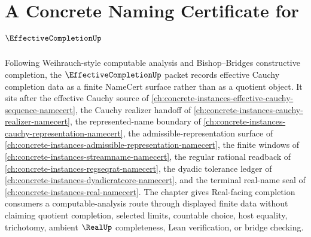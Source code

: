 \chapter{A Concrete Naming Certificate for $\EffectiveCompletionUp$}
\label{ch:concrete-instances-effective-completion-namecert}

Following Weihrauch-style computable analysis and Bishop--Bridges constructive completion, the $\EffectiveCompletionUp$ packet records effective Cauchy completion data as a finite NameCert surface rather than as a quotient object. It sits after the effective Cauchy source of \autoref{ch:concrete-instances-effective-cauchy-sequence-namecert}, the Cauchy realizer handoff of \autoref{ch:concrete-instances-cauchy-realizer-namecert}, the represented-name boundary of \autoref{ch:concrete-instances-cauchy-representation-namecert}, the admissible-representation surface of \autoref{ch:concrete-instances-admissible-representation-namecert}, the finite windows of \autoref{ch:concrete-instances-streamname-namecert}, the regular rational readback of \autoref{ch:concrete-instances-regseqrat-namecert}, the dyadic tolerance ledger of \autoref{ch:concrete-instances-dyadicratcore-namecert}, and the terminal real-name seal of \autoref{ch:concrete-instances-real-namecert}. The chapter gives Real-facing completion consumers a computable-analysis route through displayed finite data without claiming quotient completion, selected limits, countable choice, host equality, trichotomy, ambient $\RealUp$ completeness, Lean verification, or bridge checking.

